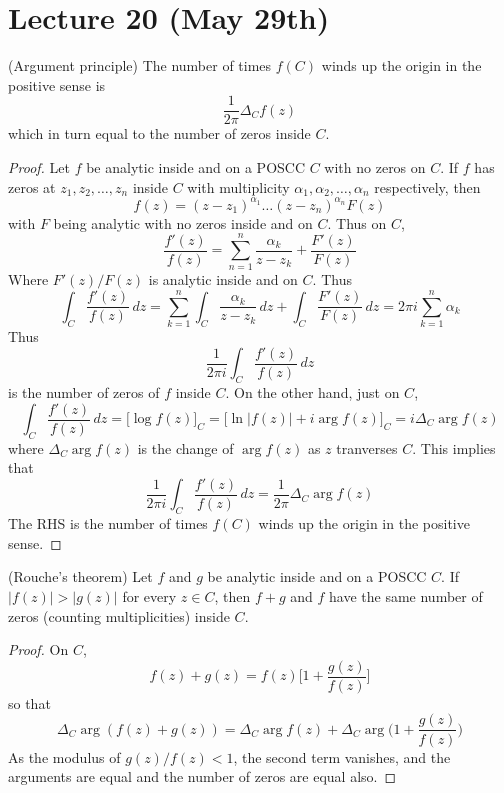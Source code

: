 \section{Lecture 20 (May 29th)}
\begin{thm}
(Argument principle) The number of times $f(C)$ winds up the origin in the positive sense is
\[\dfrac{1}{2\pi }\Delta _{C}f(z)\]
which in turn equal to the number of zeros inside $C$. 
\end{thm}
\vspace{2ex}
\begin{proof}
Let $f$ be analytic inside and on a POSCC $C$ with no zeros on $C$. If $f$ has zeros at $z_1,z_2,\ldots ,z_{n}$ inside $C$ with multiplicity $\alpha_1,\alpha_2,\ldots ,\alpha _{n}$ respectively, then 
\[f(z)=(z-z_1)^{\alpha _1}\ldots (z-z_{n})^{\alpha _{n}}F(z)\]
with $F$ being analytic with no zeros inside and on $C$. Thus on $C$,
\[\dfrac{f'(z)}{f(z)}=\sum ^{n}_{n=1}\dfrac{\alpha _{k}}{z-z_{k}}+\dfrac{F'(z)}{F(z)}\]
Where $F'(z)/F(z)$ is analytic inside and on $C$. Thus
\[\int _{C}\dfrac{f'(z)}{f(z)}\,dz=\sum ^{n}_{k=1}\int _{C}\dfrac{\alpha _{k}}{z-z_{k}}\,dz+\int _{C}\dfrac{F'(z)}{F(z)}\,dz=2\pi i\sum ^{n}_{k=1}\alpha _{k}\]
Thus 
\[\dfrac{1}{2\pi i}\int _{C}\dfrac{f'(z)}{f(z)}\,dz\]
is the number of zeros of $f$ inside $C$. On the other hand, just on $C$,
\[\int _{C}\dfrac{f'(z)}{f(z)}\,dz=\Big[\log f(z)\Big]_{C}=\Big[\ln |f(z)|+i\mathop{\mathrm{arg}}f(z)\Big]_{C}=i\Delta _{C}\mathop{\mathrm{arg}}f(z)\]
where $\Delta _{C}\mathop{\mathrm{arg}}f(z)$ is the change of $\mathop{\mathrm{arg}}f(z)$ as $z$ tranverses $C$. This implies that
\[\dfrac{1}{2\pi i}\int _{C}\dfrac{f'(z)}{f(z)}\,dz=\dfrac{1}{2\pi }\Delta _{C}\mathop{\mathrm{arg}}f(z)\]
The RHS is the number of times $f(C)$ winds up the origin in the positive sense. 
\end{proof}
\vspace{2ex}
\begin{thm}
(Rouche's theorem) Let $f$ and $g$ be analytic inside and on a POSCC $C$. If $|f(z)|>|g(z)|$ for every $z\in C$, then $f+g$ and $f$ have the same number of zeros (counting multiplicities) inside $C$. 
\end{thm}
\vspace{2ex}
\begin{proof}
On $C$, 
\[f(z)+g(z)=f(z)\Big[1+\dfrac{g(z)}{f(z)}\Big]\]
so that
\[\Delta _{C}\mathop{\mathrm{arg}}(f(z)+g(z))=\Delta _{C}\mathop{\mathrm{arg}}f(z)+\Delta _{C}\mathop{\mathrm{arg}}\Big(1+\dfrac{g(z)}{f(z)}\Big)\]
As the modulus of $g(z)/f(z)<1$, the second term vanishes, and the arguments are equal and the number of zeros are equal also. 
\end{proof}
